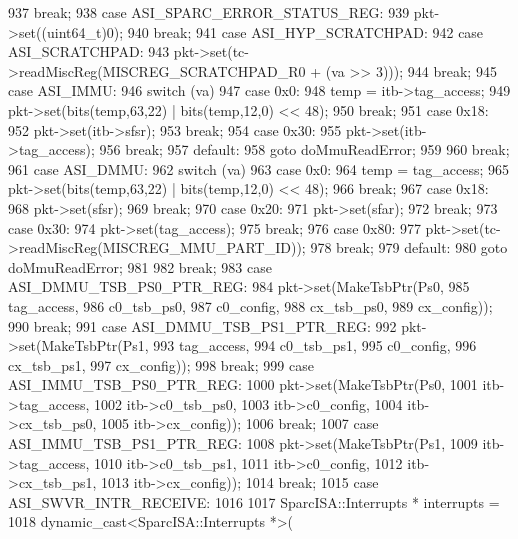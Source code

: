 \begin{DoxyCode}
{{937         break;
938       case ASI_SPARC_ERROR_STATUS_REG:
939         pkt->set((uint64_t)0);
940         break;
941       case ASI_HYP_SCRATCHPAD:
942       case ASI_SCRATCHPAD:
943         pkt->set(tc->readMiscReg(MISCREG_SCRATCHPAD_R0 + (va >> 3)));
944         break;
945       case ASI_IMMU:
946         switch (va) {
947           case 0x0:
948             temp = itb->tag_access;
949             pkt->set(bits(temp,63,22) | bits(temp,12,0) << 48);
950             break;
951           case 0x18:
952             pkt->set(itb->sfsr);
953             break;
954           case 0x30:
955             pkt->set(itb->tag_access);
956             break;
957           default:
958             goto doMmuReadError;
959         }
960         break;
961       case ASI_DMMU:
962         switch (va) {
963           case 0x0:
964             temp = tag_access;
965             pkt->set(bits(temp,63,22) | bits(temp,12,0) << 48);
966             break;
967           case 0x18:
968             pkt->set(sfsr);
969             break;
970           case 0x20:
971             pkt->set(sfar);
972             break;
973           case 0x30:
974             pkt->set(tag_access);
975             break;
976           case 0x80:
977             pkt->set(tc->readMiscReg(MISCREG_MMU_PART_ID));
978             break;
979           default:
980                 goto doMmuReadError;
981         }
982         break;
983       case ASI_DMMU_TSB_PS0_PTR_REG:
984         pkt->set(MakeTsbPtr(Ps0,
985             tag_access,
986             c0_tsb_ps0,
987             c0_config,
988             cx_tsb_ps0,
989             cx_config));
990         break;
991       case ASI_DMMU_TSB_PS1_PTR_REG:
992         pkt->set(MakeTsbPtr(Ps1,
993                 tag_access,
994                 c0_tsb_ps1,
995                 c0_config,
996                 cx_tsb_ps1,
997                 cx_config));
998         break;
999       case ASI_IMMU_TSB_PS0_PTR_REG:
1000           pkt->set(MakeTsbPtr(Ps0,
1001                 itb->tag_access,
1002                 itb->c0_tsb_ps0,
1003                 itb->c0_config,
1004                 itb->cx_tsb_ps0,
1005                 itb->cx_config));
1006         break;
1007       case ASI_IMMU_TSB_PS1_PTR_REG:
1008           pkt->set(MakeTsbPtr(Ps1,
1009                 itb->tag_access,
1010                 itb->c0_tsb_ps1,
1011                 itb->c0_config,
1012                 itb->cx_tsb_ps1,
1013                 itb->cx_config));
1014         break;
1015       case ASI_SWVR_INTR_RECEIVE:
1016         {
1017             SparcISA::Interrupts * interrupts =
1018                 dynamic_cast<SparcISA::Interrupts *>(
}}}
\end{DoxyCode}
